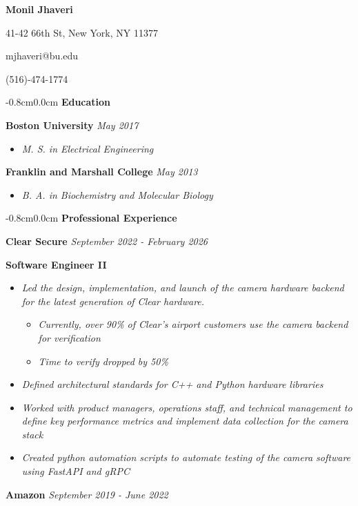 \documentclass[8pt]{extarticle}
\begin{document}
\begin{center} 
\large \textbf{Monil Jhaveri}


41-42 66th St, New York, NY 11377

mjhaveri@bu.edu 

(516)-474-1774 
\end{center} 
\begin{changemargin}{-0.8cm}{0.0cm}
\textbf{Education}
\end{changemargin}
\vspace*{-0.4cm}
\makebox[\linewidth]{\rule{17cm}{0.4pt}}
\textbf{Boston University} \textit{May 2017}
\begin{itemize}
\item \textit{M. S. in Electrical Engineering}
\end{itemize}
\textbf{Franklin and Marshall College} \textit{May 2013}
\begin{itemize}
\item \textit{B. A. in Biochemistry and Molecular Biology }

\end{itemize}
\begin{changemargin}{-0.8cm}{0.0cm}
	\textbf{Professional Experience}
\end{changemargin}
\vspace*{-0.4cm}
\makebox[\linewidth]{\rule{17cm}{0.4pt}}
\textbf{Clear Secure} \hfill\textit{September 2022 - February 2026}

{\tiny }
\textbf{Software Engineer II}
\begin{itemize}
	\item \textit{Led the design, implementation, and launch of the camera hardware backend for the latest generation of Clear hardware.} 
	\begin{itemize}
		\item \textit{Currently, over 90\% of Clear's airport customers use the camera backend  for verification}
	    \item \textit{ Time to verify dropped by 50\%}
	\end{itemize}
	\item \textit{Defined architectural standards for C++ and Python hardware libraries }
	\item \textit{Worked with product managers, operations staff, and technical management to define key performance metrics and implement data collection for the camera stack}
		\item \textit{Created python automation scripts to automate testing of the camera software using FastAPI and gRPC}
\end{itemize}
\textbf{Amazon} \hfill\textit{September 2019 - June 2022}
\end{document}
